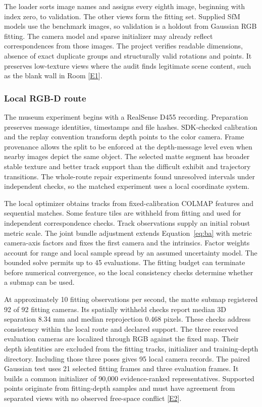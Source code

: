 The loader sorts image names and assigns every eighth image, beginning with index zero, to validation. The other views form the fitting set. Supplied SfM models use the benchmark images, so validation is a holdout from Gaussian RGB fitting. The camera model and sparse initializer may already reflect correspondences from those images. The project verifies readable dimensions, absence of exact duplicate groups and structurally valid rotations and points. It preserves low-texture views where the audit finds legitimate scene content, such as the blank wall in Room [\hyperlink{evE1}{E1}].

\subsubsection{Local RGB-D route}
The museum experiment begins with a RealSense D455 recording. Preparation preserves message identities, timestamps and file hashes. SDK-checked calibration and the replay convention transform depth points to the color camera. Frame provenance allows the split to be enforced at the depth-message level even when nearby images depict the same object. The selected matte segment has broader stable texture and better track support than the difficult exhibit and trajectory transitions. The whole-route repair experiments found unresolved intervals under independent checks, so the matched experiment uses a local coordinate system.

The local optimizer obtains tracks from fixed-calibration COLMAP features and sequential matches. Some feature tiles are withheld from fitting and used for independent correspondence checks. Track observations supply an initial robust metric scale. The joint bundle adjustment extends Equation~\ref{eq:ba} with metric camera-axis factors and fixes the first camera and the intrinsics. Factor weights account for range and local sample spread by an assumed uncertainty model. The bounded solve permits up to 45 evaluations. The fitting budget can terminate before numerical convergence, so the local consistency checks determine whether a submap can be used.

At approximately 10 fitting observations per second, the matte submap registered 92 of 92 fitting cameras. Its spatially withheld checks report median 3D separation 8.34 mm and median reprojection 0.468 pixels. These checks address consistency within the local route and declared support. The three reserved evaluation cameras are localized through RGB against the fixed map. Their depth identities are excluded from the fitting tracks, initializer and training-depth directory. Including those three poses gives 95 local camera records. The paired Gaussian test uses 21 selected fitting frames and three evaluation frames. It builds a common initializer of 90,000 evidence-ranked representatives. Supported points originate from fitting-depth samples and must have agreement from separated views with no observed free-space conflict [\hyperlink{evE2}{E2}].

